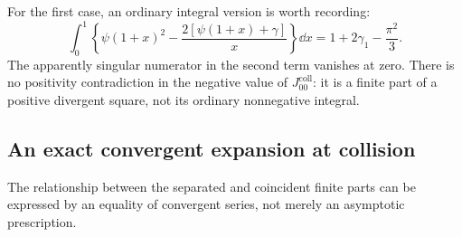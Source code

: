 For the first case, an ordinary integral version is worth recording:
\begin{equation}
 \int_0^1\left\{\psi(1+x)^2
       -\frac{2[\psi(1+x)+\gamma]}x\right\}\dd x
 =1+2\gamma_1-\frac{\pi^2}{3}.
 \label{scoll:eq:digamma-square-convergent}
\end{equation}
The apparently singular numerator in the second term vanishes at zero.
There is no positivity contradiction in the negative value of $J_{00}^{\mathrm{coll}}$:
it is a finite part of a positive divergent square, not its ordinary
nonnegative integral.

\subsection{An exact convergent expansion at collision}
The relationship between the separated and coincident finite parts can
be expressed by an equality of convergent series, not merely an
asymptotic prescription.

